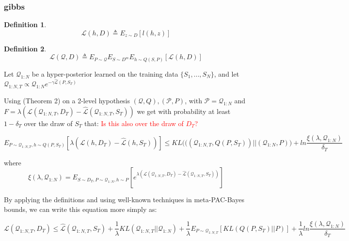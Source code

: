 \documentclass[letterpaper]{article}
\theoremstyle{definition}
\newtheorem{defn}{Definition}[section]
\begin{document}
\subsubsection{gibbs}

\begin{defn}
	$$\mathcal{L}(h, D)\triangleq E_{z\sim D}\left [l(h,z)\right ]$$
\end{defn}

\begin{defn}
	$$\mathcal{L}(\mathcal{Q}, D)\triangleq E_{P\sim \mathcal{Q}}E_{S\sim D^m}E_{h\sim Q(S,P)} \left [\mathcal{L}(h, D)\right ]$$
\end{defn}

Let $\mathcal{Q}_{1:N}$ be a hyper-posterior learned on the training data $\{S_1,...,S_N\}$, and let $\mathcal{Q}_{1:N,T}\propto \mathcal{Q}_{1:N}e^{-\gamma\hat{\mathcal{L}}(P,S_T)}$



Using \cite{Rivasplata2020} (Theorem 2) on a 2-level hypothesis $(\mathcal{Q},Q), (\mathcal{P}, P)$, with $\mathcal{P}=\mathcal{Q}_{1:N}$ and $F=\lambda\left (\mathcal{L}(\mathcal{Q}_{1:N,T}, D_T)-\hat{\mathcal{L}}(\mathcal{Q}_{1:N,T}, S_T)\right )$ we get with probability at least $1-\delta_T$ over the draw of $S_T$ that: \textcolor{red}{Is this also over the draw of $D_T$?}

$$E_{P\sim \mathcal{Q}_{1:N,T},h\sim Q(P,S_T)}\left [\lambda\left (\mathcal{L}(h, D_T)-\hat{\mathcal{L}}(h, S_T)\right )\right ]\leq KL \Big (((\mathcal{Q}_{1:N,T}, Q(P,S_T))||(\mathcal{Q}_{1:N}, P) \Big )+ ln\frac{\xi(\lambda,\mathcal{Q}_{1:N})}{\delta_T}$$

where $$\xi(\lambda,\mathcal{Q}_{1:N})=E_{S\sim D_T, P\sim \mathcal{Q}_{1:N}, h\sim P}\left [e^{\lambda\left (\mathcal{L}(\mathcal{Q}_{1:N,T}, D_T)-\hat{\mathcal{L}}(\mathcal{Q}_{1:N,T}, S_T)\right )} \right]$$

By applying the definitions and using well-known techniques in meta-PAC-Bayes bounds, we can write this equation more simply as:

$$\mathcal{L}(\mathcal{Q}_{1:N,T}, D_T) \leq \hat{\mathcal{L}}(\mathcal{Q}_{1:N,T}, S_T) + \frac{1}{\lambda}KL(\mathcal{Q}_{1:N,T}||\mathcal{Q}_{1:N})+\frac{1}{\lambda}E_{P\sim \mathcal{Q}_{1:N,T}}\left [KL(Q(P,S_T)||P)\right ]+\frac{1}{\lambda}ln\frac{\xi(\lambda,\mathcal{Q}_{1:N})}{\delta_T}$$
\end{document}
